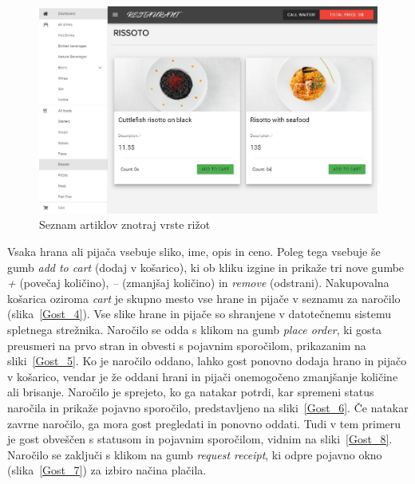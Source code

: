 \documentclass[a4paper, 12pt]{book}
\begin{document}
\begin{figure}[!htb]
\centering
\includegraphics[width=12.9cm]{customer_1.jpg}
\caption{Seznam artiklov znotraj vrste rižot}
\label{Gost_3}
\end{figure}
Vsaka hrana ali pijača vsebuje sliko, ime, opis in ceno. Poleg tega vsebuje še gumb \textit{add to cart} (dodaj v košarico), ki ob kliku izgine in prikaže tri nove gumbe \textit{+} (povečaj količino), \textit{–} (zmanjšaj količino) in \textit{remove} (odstrani). Nakupovalna košarica oziroma \textit{cart} je skupno mesto vse hrane in pijače v seznamu za naročilo (slika~\ref{Gost_4}). Vse slike hrane in pijače so shranjene v datotečnemu sistemu spletnega strežnika. Naročilo se odda s klikom na gumb \textit{place order}, ki gosta preusmeri na prvo stran in obvesti s pojavnim sporočilom, prikazanim na sliki~\ref{Gost_5}. Ko je naročilo oddano, lahko gost ponovno dodaja hrano in pijačo v košarico, vendar je že oddani hrani in pijači onemogočeno zmanjšanje količine ali brisanje. Naročilo je sprejeto, ko ga natakar potrdi, kar spremeni status naročila in prikaže pojavno sporočilo, predstavljeno na sliki~\ref{Gost_6}. Če natakar zavrne naročilo, ga mora gost pregledati in ponovno oddati. Tudi v tem primeru je gost obveščen s statusom in pojavnim sporočilom, vidnim na sliki~\ref{Gost_8}. Naročilo se zaključi s klikom na gumb \textit{request receipt}, ki odpre pojavno okno (slika~\ref{Gost_7}) za izbiro načina plačila.
\end{document}
